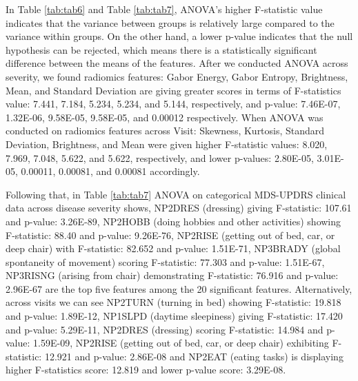 \documentclass[twocolumn]{article}
\begin{document}
In Table \ref{tab:tab6} and Table \ref{tab:tab7}, ANOVA’s higher F-statistic value indicates that the variance between groups is relatively large compared to the variance within groups. On the other hand, a lower p-value indicates that the null hypothesis can be rejected, which means there is a statistically significant difference between the means of the features. After we conducted ANOVA across severity, we found radiomics features: Gabor Energy, Gabor Entropy, Brightness, Mean, and Standard Deviation are giving greater scores in terms of F-statistics value: 7.441, 7.184, 5.234, 5.234, and 5.144, respectively, and p-value: 7.46E-07, 1.32E-06, 9.58E-05, 9.58E-05, and 0.00012 respectively. When ANOVA was conducted on radiomics features across Visit: Skewness, Kurtosis, Standard Deviation, Brightness, and Mean were given higher F-statistic values: 8.020, 7.969, 7.048, 5.622, and 5.622, respectively, and lower p-values: 2.80E-05, 3.01E-05, 0.00011, 0.00081, and 0.00081 accordingly.

Following that, in Table \ref{tab:tab7} ANOVA on categorical MDS-UPDRS clinical data across disease severity shows, NP2DRES (dressing) giving F-statistic: 107.61 and p-value: 3.26E-89, NP2HOBB (doing hobbies and other activities) showing F-statistic: 88.40 and p-value: 9.26E-76, NP2RISE (getting out of bed, car, or deep chair) with F-statistic: 82.652 and p-value: 1.51E-71, NP3BRADY (global spontaneity of movement) scoring F-statistic: 77.303 and p-value: 1.51E-67, NP3RISNG (arising from chair) demonstrating F-statistic: 76.916 and p-value: 2.96E-67 are the top five features among the 20 significant features. Alternatively, across visits we can see NP2TURN (turning in bed) showing F-statistic: 19.818 and p-value: 1.89E-12, NP1SLPD (daytime sleepiness) giving F-statistic: 17.420 and p-value: 5.29E-11, NP2DRES (dressing) scoring F-statistic: 14.984 and p-value: 1.59E-09, NP2RISE (getting out of bed, car, or deep chair) exhibiting F-statistic: 12.921 and p-value: 2.86E-08 and NP2EAT (eating tasks) is displaying higher F-statistics score: 12.819 and lower p-value score: 3.29E-08.
\end{document}
